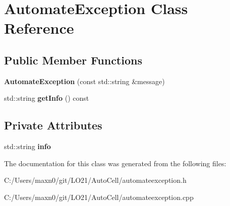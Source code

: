\hypertarget{class_automate_exception}{}\section{Automate\+Exception Class Reference}
\label{class_automate_exception}
\subsection*{Public Member Functions}
\begin{DoxyCompactItemize}
\item 
\mbox{\label{class_automate_exception_a324660f942b04229a4795cc80c3dbe82}} 
{\bfseries Automate\+Exception} (const std\+::string \&message)
\item 
\mbox{\label{class_automate_exception_a7cd3843008b505a523231877bbf88699}} 
std\+::string {\bfseries get\+Info} () const
\end{DoxyCompactItemize}
\subsection*{Private Attributes}
\begin{DoxyCompactItemize}
\item 
\mbox{\label{class_automate_exception_a016b50d51f7b0ff70ce26394e4004760}} 
std\+::string {\bfseries info}
\end{DoxyCompactItemize}


The documentation for this class was generated from the following files\+:\begin{DoxyCompactItemize}
\item 
C\+:/\+Users/maxn0/git/\+L\+O21/\+Auto\+Cell/automateexception.\+h\item 
C\+:/\+Users/maxn0/git/\+L\+O21/\+Auto\+Cell/automateexception.\+cpp\end{DoxyCompactItemize}
